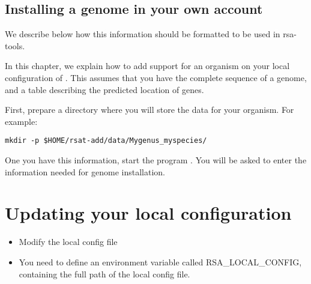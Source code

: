 \subsection{Installing a genome in your own account}

We describe below how this information should be formatted to be used
in rsa-tools.

In this chapter, we explain how to add support for an organism on your
local configuration of \RSAT. This assumes that you have the complete
sequence of a genome, and a table describing the predicted location of
genes.

First, prepare a directory where you will store the data for your
organism. For example:

\begin{verbatim}
mkdir -p $HOME/rsat-add/data/Mygenus_myspecies/
\end{verbatim}


One you have this information, start the program
. You will be asked to enter the information
needed for genome installation.

\section{Updating your local configuration}


\begin{itemize}
\item Modify the local config file

\item You need to define an environment variable called
  RSA\_LOCAL\_CONFIG, containing the full path of the local config
  file.

\end{itemize}
